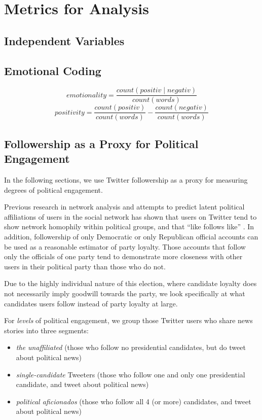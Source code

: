 \chapter{Metrics for Analysis}
\section{Independent Variables}
\section{Emotional Coding}


$$ emotionality = \frac{count(positiv \mid negativ)}{count(words)}$$
$$ positivity = \frac{count(positiv)}{count(words)} - \frac{count(negativ)}{count(words)}$$


 \section{Followership as a Proxy for Political Engagement}
In the following sections, we use Twitter followership as a proxy for measuring degrees of political engagement. 

Previous research in network analysis and attempts to predict latent political affiliations of users in the social network has shown that users on Twitter tend to show network homophily within political groups, and that ``like follows like'' \cite{colleoni2014echo}. In addition, followership of only Democratic or only Republican official accounts can be used as a reasonable estimator of party loyalty. Those accounts that follow only the officials of one party tend to demonstrate more closeness with other users in their political party than those who do not.
            
Due to the highly individual nature of this election, where candidate loyalty does not necessarily imply goodwill towards the party, we look specifically at what candidates users follow instead of party loyalty at large. 

For \emph{levels} of political engagement, we group those Twitter users who share news stories into three segments: 

\begin{itemize}
  \item \emph{the unaffiliated} (those who follow no presidential candidates, but do tweet about political news)
  \item \emph{single-candidate} Tweeters (those who follow one and only one presidential candidate, and tweet about political news)
  \item \emph{political aficionados} (those who follow all 4 (or more) candidates, and tweet about political news)
\end{itemize}

